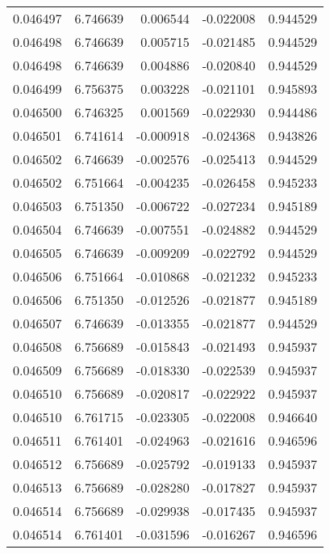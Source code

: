 \begin{tabular}{lrrrr}
0.046497    &  6.746639 &  0.006544 & -0.022008 &             0.944529 \\
0.046498    &  6.746639 &  0.005715 & -0.021485 &             0.944529 \\
0.046498    &  6.746639 &  0.004886 & -0.020840 &             0.944529 \\
0.046499    &  6.756375 &  0.003228 & -0.021101 &             0.945893 \\
0.046500    &  6.746325 &  0.001569 & -0.022930 &             0.944486 \\
0.046501    &  6.741614 & -0.000918 & -0.024368 &             0.943826 \\
0.046502    &  6.746639 & -0.002576 & -0.025413 &             0.944529 \\
0.046502    &  6.751664 & -0.004235 & -0.026458 &             0.945233 \\
0.046503    &  6.751350 & -0.006722 & -0.027234 &             0.945189 \\
0.046504    &  6.746639 & -0.007551 & -0.024882 &             0.944529 \\
0.046505    &  6.746639 & -0.009209 & -0.022792 &             0.944529 \\
0.046506    &  6.751664 & -0.010868 & -0.021232 &             0.945233 \\
0.046506    &  6.751350 & -0.012526 & -0.021877 &             0.945189 \\
0.046507    &  6.746639 & -0.013355 & -0.021877 &             0.944529 \\
0.046508    &  6.756689 & -0.015843 & -0.021493 &             0.945937 \\
0.046509    &  6.756689 & -0.018330 & -0.022539 &             0.945937 \\
0.046510    &  6.756689 & -0.020817 & -0.022922 &             0.945937 \\
0.046510    &  6.761715 & -0.023305 & -0.022008 &             0.946640 \\
0.046511    &  6.761401 & -0.024963 & -0.021616 &             0.946596 \\
0.046512    &  6.756689 & -0.025792 & -0.019133 &             0.945937 \\
0.046513    &  6.756689 & -0.028280 & -0.017827 &             0.945937 \\
0.046514    &  6.756689 & -0.029938 & -0.017435 &             0.945937 \\
0.046514    &  6.761401 & -0.031596 & -0.016267 &             0.946596 \\

\end{tabular}
